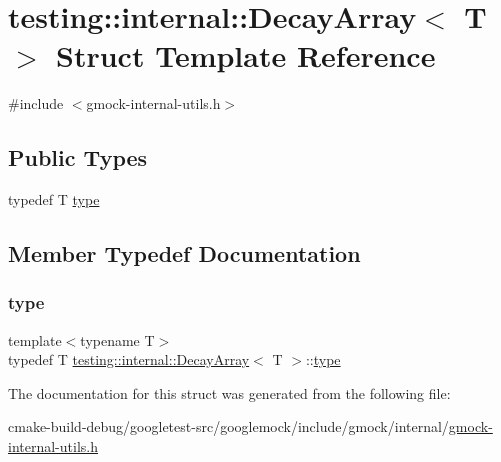 \hypertarget{structtesting_1_1internal_1_1DecayArray}{}\section{testing\+::internal\+::Decay\+Array$<$ T $>$ Struct Template Reference}
\label{structtesting_1_1internal_1_1DecayArray}


{\ttfamily \#include $<$gmock-\/internal-\/utils.\+h$>$}

\subsection*{Public Types}
\begin{DoxyCompactItemize}
\item 
typedef T \mbox{\hyperlink{structtesting_1_1internal_1_1DecayArray_a39803f9bafd56bc4531f86eb34fe9c0f}{type}}
\end{DoxyCompactItemize}


\subsection{Member Typedef Documentation}
\mbox{\label{structtesting_1_1internal_1_1DecayArray_a39803f9bafd56bc4531f86eb34fe9c0f}} 
\subsubsection{\texorpdfstring{type}{type}}
{\footnotesize\ttfamily template$<$typename T$>$ \\
typedef T \mbox{\hyperlink{structtesting_1_1internal_1_1DecayArray}{testing\+::internal\+::\+Decay\+Array}}$<$ T $>$\+::\mbox{\hyperlink{structtesting_1_1internal_1_1DecayArray_a39803f9bafd56bc4531f86eb34fe9c0f}{type}}}



The documentation for this struct was generated from the following file\+:\begin{DoxyCompactItemize}
\item 
cmake-\/build-\/debug/googletest-\/src/googlemock/include/gmock/internal/\mbox{\hyperlink{gmock-internal-utils_8h}{gmock-\/internal-\/utils.\+h}}\end{DoxyCompactItemize}
